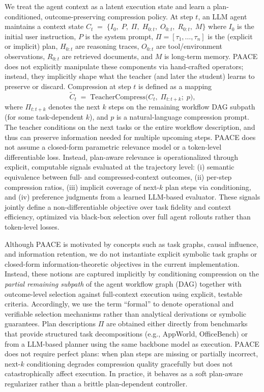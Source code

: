 \documentclass{article}
\theoremstyle{plain}
\theoremstyle{definition}
\theoremstyle{remark}
\begin{document}
We treat the agent context as a latent execution state and learn a plan-conditioned,
outcome-preserving compression policy. At step \(t\), an LLM agent maintains a context state
$C_t
    \;=\;
    \bigl\{
        I_0,\;
        P,\;
        \Pi,\;
        H_{0:t},\;
        O_{0:t},\;
        R_{0:t},\;
        M
    \bigr\}$
where \(I_0\) is the initial user instruction, \(P\) is the system prompt,
\(\Pi = [\tau_1,\dots,\tau_n]\) is the (explicit or implicit) plan,
\(H_{0:t}\) are reasoning traces, \(O_{0:t}\) are tool/environment observations,
\(R_{0:t}\) are retrieved documents, and \(M\) is long-term memory. PAACE does not explicitly manipulate these components via hand-crafted operators;
instead, they implicitly shape what the teacher (and later the student) learns to preserve or discard. Compression at step \(t\) is defined as a mapping
\begin{equation}
    \tilde{C}_t
    \;=\;
    \mathrm{TeacherCompress}\bigl(C_t,\; \Pi_{t:t+k};\; p\bigr),
\end{equation}
where \(\Pi_{t:t+k}\) denotes the next \(k\) steps on the remaining workflow DAG subpath (for some task-dependent \(k\)),
and \(p\) is a natural-language compression prompt.
The teacher conditions on the next tasks or the entire workflow description,
and thus can preserve information needed for multiple upcoming steps.
PAACE does not assume a closed-form parametric relevance model or a
token-level differentiable loss.
Instead, plan-aware relevance is operationalized through explicit,
computable signals evaluated at the trajectory level:
(i) semantic equivalence between full- and compressed-context outcomes,
(ii) per-step compression ratios,
(iii) implicit coverage of next-$k$ plan steps via conditioning, and
(iv) preference judgments from a learned LLM-based evaluator.
These signals jointly define a non-differentiable objective over task
fidelity and context efficiency, optimized via black-box selection over
full agent rollouts rather than token-level losses.


Although PAACE is motivated by concepts such as task graphs, causal influence,
and information retention, we do not instantiate explicit symbolic task graphs
or closed-form information-theoretic objectives in the current implementation.
Instead, these notions are captured implicitly by conditioning compression on
the \emph{partial remaining subpath} of the agent workflow graph (DAG) together with
outcome-level selection against full-context execution using explicit, testable
criteria. Accordingly, we use the term ``formal'' to denote operational and
verifiable selection mechanisms rather than analytical derivations or symbolic
guarantees. Plan descriptions $\Pi$ are obtained either directly from benchmarks that
provide structured task decompositions (e.g., AppWorld, OfficeBench) or from
a LLM-based planner using the same backbone model as execution.
PAACE does not require perfect plans: when plan steps are missing or partially
incorrect, next-$k$ conditioning degrades compression quality gracefully but
does not catastrophically affect execution. In practice, it behaves as a
soft plan-aware regularizer rather than a brittle plan-dependent controller.
\end{document}
